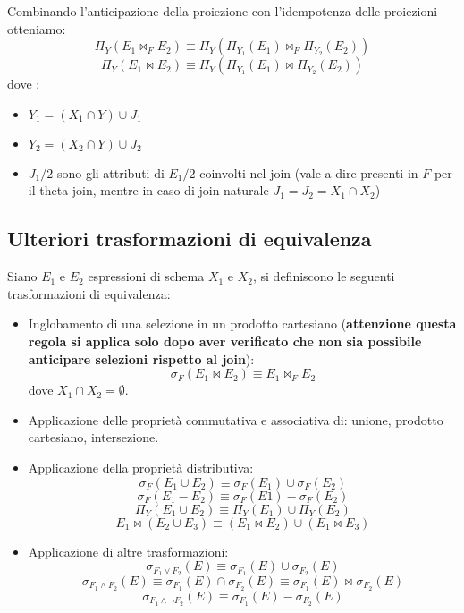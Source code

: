 \documentclass[a4paper, 10pt]{article}
\theoremstyle{definition}
\begin{document}
			Combinando l'anticipazione della proiezione con
			l'idempotenza delle proiezioni otteniamo:
			\[
				\Pi_Y (E_1 \Join_F E_2)	\equiv \Pi_Y (\Pi_{Y_1} (E_1)\Join_F \Pi_{Y_2} (E_2))
			\]
			\[
				\Pi_Y (E_1 \Join E_2) \equiv \Pi_Y (\Pi_{Y_1} (E_1)\Join \Pi_{Y_2} (E_2))
			\]
			dove :
			\begin{itemize}
				\item $ Y_1 = (X_1 \cap Y) \cup J_1 $
				\item $ Y_2 = (X_2 \cap Y) \cup J_2 $
				\item $J_1/2$ sono gli attributi di $E_1/2$ coinvolti nel join (vale a
				dire presenti in $F$ per il theta-join, mentre in caso di join
				naturale $J_1 = J_2 = X_1 \cap X_2$)
			\end{itemize}
			
		\subsection{Ulteriori trasformazioni di equivalenza}
			Siano $E_1$ e $E_2$ espressioni di schema $X_1$ e $X_2$, si
			definiscono le seguenti trasformazioni di equivalenza:
			\begin{itemize}
				\item Inglobamento di una selezione in un prodotto
				cartesiano (\textbf{attenzione questa regola si applica solo
				dopo aver verificato che non sia possibile anticipare selezioni rispetto al join}):
					\[
						\sigma_F (E_1 \Join E_2) \equiv E_1 \Join_F E_2	
					\]
				dove $X_1 \cap X_2 = \emptyset$.
				\item Applicazione delle proprietà commutativa e
				associativa di: unione, prodotto cartesiano,
				intersezione.
				\item Applicazione della proprietà distributiva:
					\[
						\sigma_F (E_1 \cup E_2) \equiv \sigma_F (E_1) \cup \sigma_F (E_2)
					\]
					\[
						\sigma_F (E_1 - E_2) \equiv \sigma_F (E1) - \sigma_F (E_2)
					\]
					\[
						\Pi_Y (E_1 \cup E_2) \equiv \Pi_Y (E_1) \cup \Pi_Y (E_2)
					\]
					\[
						E_1 \Join (E_2 \cup E_3) \equiv (E_1 \Join E_2) \cup (E_1 \Join E_3) 
					\]
				\item Applicazione di altre trasformazioni:
					\[
						\sigma_{F_1 \vee F_2} (E) \equiv \sigma_{F_1} (E) \cup \sigma_{F_2} (E)
					\]
					\[
						\sigma_{F_1 \wedge F_2} (E) \equiv \sigma_{F_1} (E) \cap \sigma_{F_2} (E) \equiv \sigma_{F_1} (E) \Join \sigma_{F_2} (E)
					\]
					\[
						\sigma_{F_1 \wedge \neg F_2} (E) \equiv \sigma_{F_1} (E) - \sigma_{F_2} (E)
					\]
			\end{itemize}
	
\end{document}
